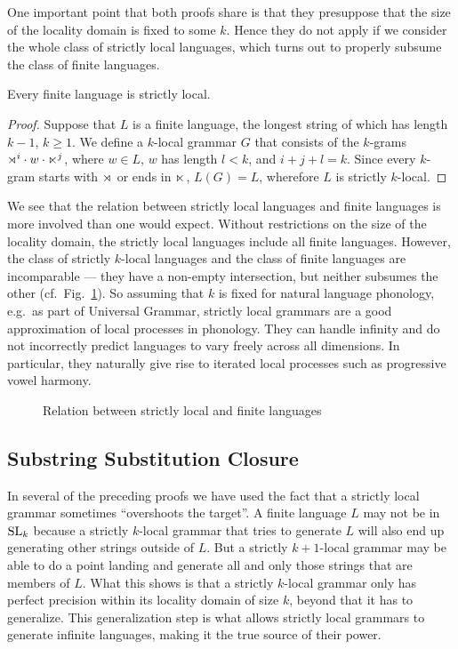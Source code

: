 One important point that both proofs share is that they presuppose that the size of the locality domain is fixed to some $k$.
Hence they do not apply if we consider the whole class of strictly local languages, which turns out to properly subsume the class of finite languages.
%
\begin{theorem}
    Every finite language is strictly local.
\end{theorem}
%
\begin{proof}
    Suppose that $L$ is a finite language, the longest string of which has length $k - 1$, $k \geq 1$.
    We define a $k$-local grammar $G$ that consists of the $k$-grams $\rtimes^i \cdot w \cdot \ltimes^j$, where $w \in L$, $w$ has length $l < k$, and $i + j + l = k$.
    Since every $k$-gram starts with $\rtimes$ or ends in $\ltimes$, $L(G) = L$, wherefore $L$ is strictly $k$-local.
\end{proof}
%
We see that the relation between strictly local languages and finite languages is more involved than one would expect.
Without restrictions on the size of the locality domain, the strictly local languages include all finite languages.
However, the class of strictly $k$-local languages and the class of finite languages are incomparable --- they have a non-empty intersection, but neither subsumes the other (cf.\ Fig.~\ref{fig:SLMath_SL-Fin}).
So assuming that $k$ is fixed for natural language phonology, e.g.\ as part of Universal Grammar, strictly local grammars are a good approximation of local processes in phonology.
They can handle infinity and do not incorrectly predict languages to vary freely across all dimensions.
In particular, they naturally give rise to iterated local processes such as progressive vowel harmony.
%
\begin{figure}[htpb]
    \centering
    
    \caption{Relation between strictly local and finite languages}
    \label{fig:SLMath_SL-Fin}
\end{figure}

\subsection{Substring Substitution Closure}
\label{sub:SLMath_SubstitutionClosure}

In several of the preceding proofs we have used the fact that a strictly local grammar sometimes ``overshoots the target''.
A finite language $L$ may not be in $\mathrm{SL}_k$ because a strictly $k$-local grammar that tries to generate $L$ will also end up generating other strings outside of $L$.
But a strictly $k+1$-local grammar may be able to do a point landing and generate all and only those strings that are members of $L$.
What this shows is that a strictly $k$-local grammar only has perfect precision within its locality domain of size $k$, beyond that it has to generalize.
This generalization step is what allows strictly local grammars to generate infinite languages, making it the true source of their power.

